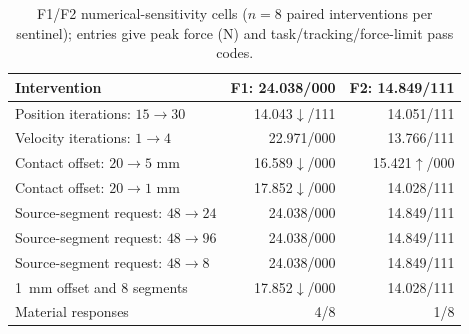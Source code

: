 \begin{table}[t]
\centering
\caption{F1/F2 numerical-sensitivity cells ($n=8$ paired interventions per
sentinel); entries give peak force (N) and task/tracking/force-limit pass codes.}
\label{tab:numerical_cells_f1_f2}
\vspace{-3mm}
\scriptsize
\setlength{\tabcolsep}{3.2pt}
\renewcommand{\arraystretch}{0.90}
\begin{tabular}{@{}lrr@{}}
\toprule
Intervention & F1: 24.038/000 & F2: 14.849/111 \\
\midrule
Position iterations: $15\rightarrow30$ & 14.043$\downarrow$/111 & 14.051/111 \\
Velocity iterations: $1\rightarrow4$ & 22.971/000 & 13.766/111 \\
Contact offset: $20\rightarrow5$ mm & 16.589$\downarrow$/000 & 15.421$\uparrow$/000 \\
Contact offset: $20\rightarrow1$ mm & 17.852$\downarrow$/000 & 14.028/111 \\
Source-segment request: $48\rightarrow24$ & 24.038/000 & 14.849/111 \\
Source-segment request: $48\rightarrow96$ & 24.038/000 & 14.849/111 \\
Source-segment request: $48\rightarrow8$ & 24.038/000 & 14.849/111 \\
1~mm offset and 8 segments & 17.852$\downarrow$/000 & 14.028/111 \\
\midrule
Material responses & 4/8 & 1/8 \\
\bottomrule
\end{tabular}
\end{table}

